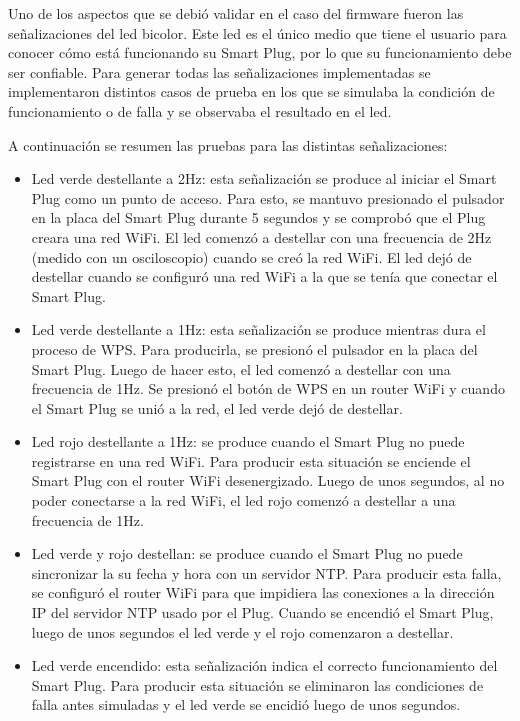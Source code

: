 Uno de los aspectos que se debió validar en el caso del firmware fueron las señalizaciones del led bicolor. Este led es el único medio que tiene el usuario para conocer cómo está funcionando su Smart Plug, por lo que su funcionamiento debe ser confiable. Para generar todas las señalizaciones implementadas se implementaron distintos casos de prueba en los que se simulaba la condición de funcionamiento o de falla y se observaba el resultado en el led.

A continuación se resumen las pruebas para las distintas señalizaciones:

\begin{itemize}
\item Led verde destellante a 2Hz: esta señalización se produce al iniciar el Smart Plug como un punto de acceso. Para esto, se mantuvo presionado el pulsador en la placa del Smart Plug durante 5 segundos y se comprobó que el Plug creara una red WiFi. El led comenzó a destellar con una frecuencia de 2Hz (medido con un osciloscopio) cuando se creó la red WiFi. El led dejó de destellar cuando se configuró una red WiFi a la que se tenía que conectar el Smart Plug.
\item Led verde destellante a 1Hz: esta señalización se produce mientras dura el proceso de WPS. Para producirla, se presionó el pulsador en la placa del Smart Plug. Luego de hacer esto, el led comenzó a destellar con una frecuencia de 1Hz. Se presionó el botón de WPS en un router WiFi y cuando el Smart Plug se unió a la red, el led verde dejó de destellar.
\item Led rojo destellante a 1Hz: se produce cuando el Smart Plug no puede registrarse en una red WiFi. Para producir esta situación se enciende el Smart Plug con el router WiFi desenergizado. Luego de unos segundos, al no poder conectarse a la red WiFi, el led rojo comenzó a destellar a una frecuencia de 1Hz.
\item Led verde y rojo destellan: se produce cuando el Smart Plug no puede sincronizar la su fecha y hora con un servidor NTP. Para producir esta falla, se configuró el router WiFi para que impidiera las conexiones a la dirección IP del servidor NTP usado por el Plug. Cuando se encendió el Smart Plug, luego de unos segundos el led verde y el rojo comenzaron a destellar.
\item Led verde encendido: esta señalización indica el correcto funcionamiento del Smart Plug. Para producir esta situación se eliminaron las condiciones de falla antes simuladas y el led verde se encidió luego de unos segundos.
\end{itemize}


